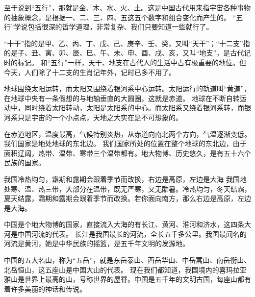 \documentclass[avery5371,grid]{flashcards}
\begin{document}
{至于说到“五行”，那就是金、木、水、火、土。这是中国古代用来指宇宙各种事物的抽象概念，是根据一、二、三、四、五这五个数字和组合变化而产生的。} %
{“五行”学说包括很深的哲学道理，非常复杂、我们只要知道一些就行了。} %


{“十干”指的是甲、乙、丙、丁、戊、己、庚辛、壬、癸，又叫“天干”；“十二支”指的是子、丑、寅、卯、辰、巳、午、未、申、酉、戌、亥，又叫“地支”，是古代记时的标记。} %
{和“五行”一样，天干、地支在古代人的生活中占有极重要的地位。但今天，人们除了十二支的生肖记年外，记时已多不用了。} %

{地球围绕太阳运转，而太阳又围绕着银河系中心运转。太阳运行的轨道叫“黄道”，在地球中央有一条假想的与地轴垂直的大圆圈，这就是赤道。} %
{地球在不断自转运动中，同时绕着太阳转动，太阳是太阳系的中心。而太阳系又绕着银河系转，而银河系只是宇宙的一个小点点，天地之大实在是不可想象的。} %

{在赤道地区，温度最高，气候特别炎热，从赤道向南北两个方向，气温逐渐变低。我们国家是地处地球的东北边。} %
{我们国家所处的位置在整个地球的东北边，由于面积辽阔，热带、温带、寒带三个温带都有。地大物博、历史悠久，是有五十六个民族的国家。} %

{我国冷热均匀，霜期和露期会跟着季节而改换，右边是高原，左边是大海} %
{我国地处寒、温、热三带，大部分在温带，既无严寒，又无酷暑。冷热均匀，冬天结霜，夏天结露，霜期和露期会跟着季节而改换。若你面向南方，那么右边是高原，左边是大海。} %

{中国是个地大物博的国家，直接流入大海的有长江、黄河、淮河和济水，这四条大河是中国河流的代表。} %
{长江是我国最长的河流，全长五千多公里。我国最闻名的河流是黄河，她是中华民族的摇篮，是五千年文明的发源地。} %

{中国的五大名山，称为“五岳”，就是东岳泰山、西岳华山、中岳蒿山、南岳衡山、北岳恒山，这五座山是中国大山的代表。} %
{现在我们都知道，我国境内的喜玛拉亚雅山是世界上最高的山，号称世界的屋脊。中国是五千年的文明古国，每座山都有着许多美丽的神话和传说。} %
\end{document}
